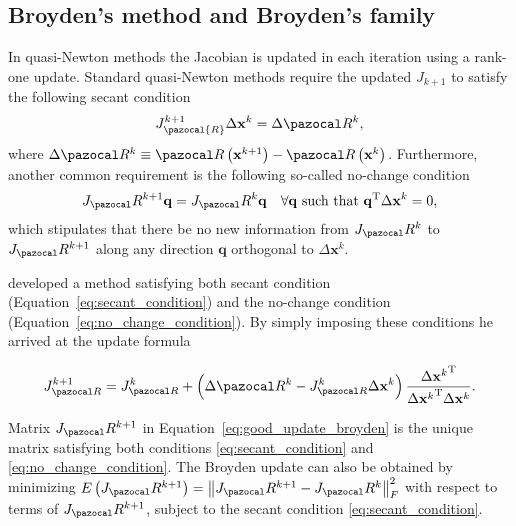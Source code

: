 \subsection{Broyden's method and Broyden's family}

In quasi-Newton methods the Jacobian is updated in each iteration using a rank-one update.
Standard quasi-Newton methods require the updated \(J_{k+1}\) to satisfy the following secant condition
\begin{equation} \label{eq:secant_condition}
J_\pazocal{R}^{k+1} \Delta \mathbf x^{k}=\Delta \pazocal R^{k},
\end{equation}
where \(\Delta \pazocal R^{k}\equiv \pazocal R\left(\mathbf x^{k+1}\right)-\pazocal R\left(\mathbf x^ {k}\right)\).
Furthermore, another common requirement is the following so-called no-change condition
\begin{equation} \label{eq:no_change_condition}
J_\pazocal R^{k+1} \mathbf q=J_\pazocal R^{k} \mathbf q \quad \forall \mathbf q \text { such that } \mathbf q^{\mathrm{T}} \Delta \mathbf x^{k}=0,
\end{equation}
which stipulates that there be no new information from \(J_\pazocal R^{k}\) to \(J_\pazocal R^{k+1}\) along any direction \(\mathbf q\) orthogonal to \(\Delta \mathbf x^{k}\).

\cite{broyden} developed a method satisfying both secant condition (Equation~\eqref{eq:secant_condition}) and the no-change condition (Equation~\eqref{eq:no_change_condition}).
By simply imposing these conditions he arrived at the update formula
\begin{highlight}
\begin{equation} \label{eq:good_update_broyden}
J_{\pazocal R}^{k+1}=J_{\pazocal R}^{k}+\left(\Delta \pazocal R^{k}-J_{\pazocal R}^{k} \Delta \mathbf x^{k}\right) \frac{\Delta {\mathbf x^{k}}^{\mathrm{T}}}{\Delta {\mathbf x^{k}}^{\mathrm{T}} \Delta \mathbf x^{k}}.
\end{equation}
\end{highlight}

Matrix \(J_\pazocal R^{k+1}\) in Equation~\eqref{eq:good_update_broyden} is the unique matrix satisfying both conditions \eqref{eq:secant_condition} and \eqref{eq:no_change_condition}.
The Broyden update can also be obtained by minimizing \(E\left(J_\pazocal R^{k+1}\right)=\left\|J_\pazocal R^{k+1}-J_\pazocal R^{k}\right\|_{F}^{2}\) with respect to terms of \(J_\pazocal R^{k+1}\), subject to the secant condition \eqref{eq:secant_condition}.

